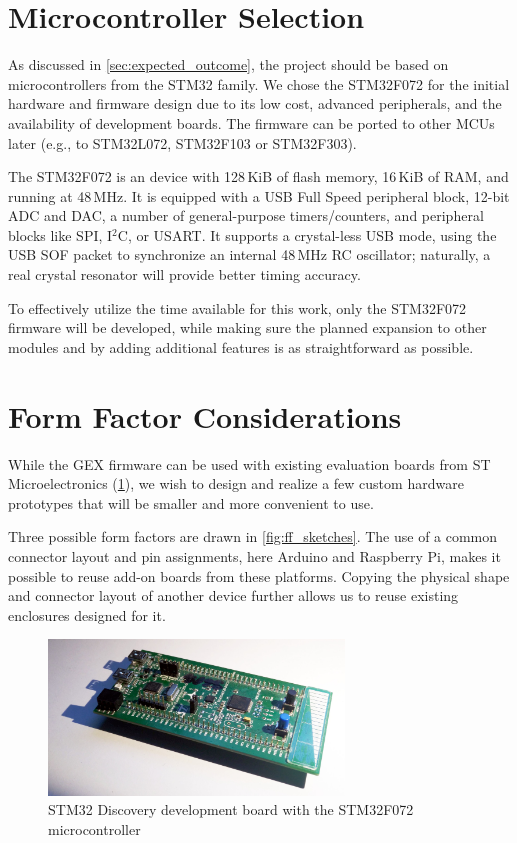 \section{Microcontroller Selection}

As discussed in \cref{sec:expected_outcome}, the project should be based on microcontrollers from the STM32 family. We chose the STM32F072 for the initial hardware and firmware design due to its low cost, advanced peripherals, and the availability of development boards. The firmware can be ported to other \glspl{MCU} later (e.g., to STM32L072, STM32F103 or STM32F303).

The STM32F072 is an \armcm device with 128\,KiB of flash memory, 16\,KiB of \gls{RAM}, and running at 48\,MHz. It is equipped with a \gls{USB} Full Speed peripheral block, 12-bit \gls{ADC} and \gls{DAC}, a number of general-purpose timers/counters, and peripheral blocks like SPI, I$^2$C, or USART. It supports a crystal-less \gls{USB} mode, using the \gls{USB} SOF packet to synchronize an internal 48\,MHz RC oscillator; naturally, a real crystal resonator will provide better timing accuracy.

To effectively utilize the time available for this work, only the STM32F072 firmware will be developed, while making sure the planned expansion to other modules and by adding additional features is as straightforward as possible.

\section{Form Factor Considerations} \label{sec:formfactors}

While the GEX firmware can be used with existing evaluation boards from ST Microelectronics (\cref{fig:discovery}), we wish to design and realize a few custom hardware prototypes that will be smaller and more convenient to use.

Three possible form factors are drawn in \cref{fig:ff_sketches}. The use of a common connector layout and pin assignments, here Arduino and Raspberry Pi, makes it possible to reuse add-on boards from these platforms. Copying the physical shape and connector layout of another device further allows us to reuse existing enclosures designed for it.

\begin{figure}[h]
	\centering
	\includegraphics[width=0.7\textwidth] {img/disco072.jpg}
	\caption[Discovery board with STM32F072]{\label{fig:discovery}STM32 Discovery development board with the STM32F072 microcontroller}
\end{figure}

